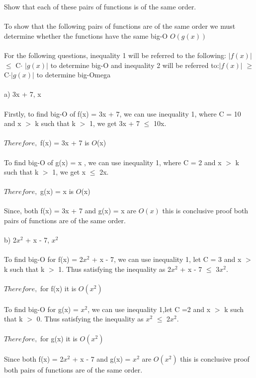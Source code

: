\documentclass{article}
\begin{document}
Show that each of these pairs of functions is of the same order. \\ \\
To show that the following pairs of functions are of the same order we must determine whether the functions have the same big-O $O(g(x))$ \\\\
For the following questions, inequality 1 will be referred to the following: $\left| f(x) \right|$$\leq$ C$\cdot$ $\left| g(x) \right|$ to determine big-O and inequality 2 will be referred to:$\left| f(x) \right|$ $\geq$ C$\cdot$$\left| g(x) \right|$ to determine big-Omega \\ \\
a) 3x + 7, x \\\\
Firstly, to find big-O of f(x) = 3x + 7, we can use inequality 1, where C = 10 and x $>$ k such that k $>$ 1, we get 3x + 7 $\leq$ 10x. \\\\
$Therefore,$ f(x) = 3x + 7 is $O$(x) \\\\
To find big-O of g(x) = x , we can use inequality 1, where C = 2 and x $>$ k such that k $>$ 1, we get x $\leq$ 2x. \\\\
$Therefore,$ g(x) = x  is $O$(x) \\\\
Since, both f(x) = 3x + 7 and g(x) = x are  $O(x)$ this is conclusive proof both pairs of functions are of the same order. \\\\
b) 2$x^2$ + x - 7, $x^2$ \\ \\
To find big-O for f(x) =  2$x^2$ + x - 7, we can use inequality 1, let C = 3 and x $>$ k such that k $>$ 1. Thus satisfying the inequality as 2$x^2$ + x - 7 $\leq$ 3$x^2$. \\ \\ $Therefore,$ for f(x) it is $O(x^2)$ \\ \\  
To find big-O for g(x) = $x^2$, we can use inequality 1,let C =2 and  x $>$ k such that k $>$ 0. Thus satisfying the inequality as $x^2$ $\leq$ 2$x^2$. \\\\ $Therefore,$ for g(x) it is $O(x^2)$ \\ \\ 
Since both f(x) = 2$x^2$ + x - 7 and g(x) = $x^2$ are  $O(x^2)$ this is conclusive proof both pairs of functions are of the same order. \\\\
\end{document}
